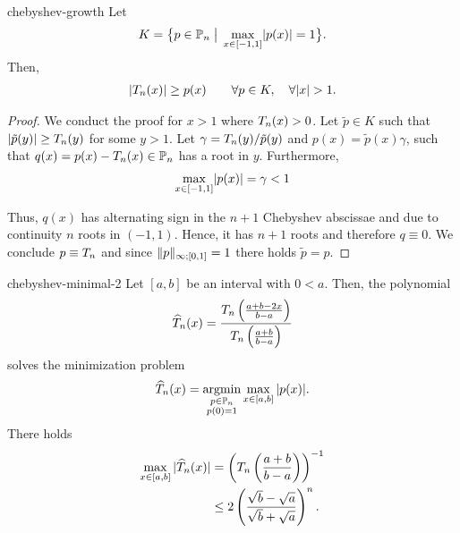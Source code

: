 \begin{Lemma}{chebyshev-growth}
  Let
  \begin{gather}
    K = \bigl\{ p\in \mathbb P_n \;\big|\; \max_{x\in[-1,1]} \lvert p(x)\rvert =1 \bigr\}.
  \end{gather}
  Then,
  \begin{gather}
    \lvert T_n(x)\rvert \ge p(x) \qquad \forall p\in K, \quad \forall \lvert x\rvert > 1.
  \end{gather}
\end{Lemma}

\begin{proof}
  We conduct the proof for $x>1$ where $T_n(x) > 0$.
  Let $\tilde p\in K$ such that
  $\lvert\tilde p(y)\rvert \ge T_n(y)$ for some $y>1$. Let
  $\gamma = T_n(y)/\tilde p(y)$ and
  $p(x) = \tilde p(x)\gamma$, such that
  $q(x) = p(x) - T_n(x) \in \mathbb P_n$ has a root in $y$.
  Furthermore,
  \begin{gather}
    \max_{x\in[-1,1]} \lvert p(x)\rvert =\gamma < 1
  \end{gather}

  Thus, $q(x)$ has alternating sign in the $n+1$ Chebyshev abscissae and due to continuity $n$ roots in
  $(-1,1)$. Hence, it has $n+1$ roots and therefore
  $q \equiv 0$. We conclude $p \equiv T_n$ and since
  $\lVert p\rVert_{\infty;[0,1]} = 1$ there holds $\tilde p = p$.
\end{proof}

\begin{Corollary}{chebyshev-minimal-2}
  Let $[a,b]$ be an interval with $0 < a$. Then, the polynomial
  \begin{gather}
    \widehat \pchebyshev_n(x)
    = \frac{\pchebyshev_n\left(\frac{a+b-2x}{b-a}\right)}%
    {\pchebyshev_n\left(\frac{a+b}{b-a}\right)}
  \end{gather}
  solves the minimization problem
  \begin{gather}
    \widehat {T}_n(x)
    = \operatorname*{argmin}_{\substack{p\in\mathbb P_n\\p(0) = 1}}
    \max_{x\in[a,b]}{\lvert p(x)\rvert}.
  \end{gather}
  There holds
  \begin{align}
    \label{eq:chebyshev-cg1}
    \max_{x\in[a,b]}{\lvert\widehat {T}_n(x)\rvert}
    &= \left(T_n\left(\frac{a+b}{b-a}\right)\right)^{-1}\\
    & \le 2 \left(\frac{\sqrt b-\sqrt a}{\sqrt b + \sqrt a}\right)^n.
  \end{align}
\end{Corollary}

